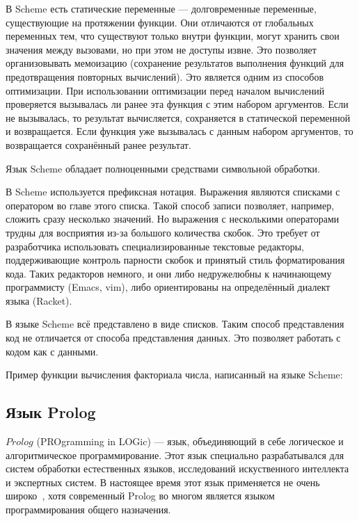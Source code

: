         В Scheme есть статические переменные --- долговременные переменные, существующие на протяжении функции.
        Они отличаются от глобальных переменных тем, что существуют только внутри функции, могут хранить свои значения между вызовами, но при этом не доступы извне.
        Это позволяет организовывать мемоизацию (сохранение результатов выполнения функций для предотвращения повторных вычислений).
        Это является одним из способов оптимизации.
        При использовании оптимизации перед началом вычислений проверяется вызывалась ли ранее эта функция с этим набором аргументов.
        Если не вызывалась, то результат вычисляется, сохраняется в статической переменной и возвращается.
        Если функция уже вызывалась с данным набором аргументов, то возвращается сохранённый ранее результат.
        
        Язык Scheme обладает полноценными средствами символьной обработки.

        В Scheme используется префиксная нотация.
        Выражения являются списками с оператором во главе этого списка.
        Такой способ записи позволяет, например, сложить сразу несколько значений.
        Но выражения с несколькими операторами трудны для восприятия из-за большого количества скобок.
        Это требует от разработчика использовать специализированные текстовые редакторы, поддерживающие контроль парности скобок и принятый стиль форматирования кода.
        Таких редакторов немного, и они либо недружелюбны к начинающему программисту (Emacs, vim), либо ориентированы на определённый диалект языка (Racket).

        В языке Scheme всё представлено в виде списков.
        Таким способ представления код не отличается от способа представления данных.
        Это позволяет работать с кодом как с данными.

        Пример функции вычисления факториала числа, написанный на языке Scheme:

        

    \subsection{Язык Prolog}
        $Prolog$ (PROgramming in LOGic) --- язык, объединяющий в себе логическое и алгоритмическое программирование.
        Этот язык специально разрабатывался для систем обработки естественных языков, исследований искуственного интеллекта и экспертных систем.
        В настоящее время этот язык применяется не очень широко~\cite{TIOBE}, хотя современный Prolog во многом является языком программирования общего назначения.

